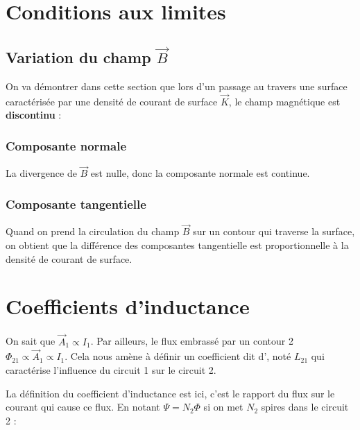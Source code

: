 \documentclass[12pt]{book}
\begin{document}
\section{Conditions aux limites}
\subsection{Variation du champ $\vec{B}$}
On va démontrer dans cette section que lors d'un passage au travers une surface caractérisée par une densité de courant de surface $\vec{K}$, le champ magnétique est \textbf{discontinu} :

\subsubsection{Composante normale}
La divergence de $\vec{B}$ est nulle, donc la composante normale est continue.
\subsubsection{Composante tangentielle}
Quand on prend la circulation du champ $\vec{B}$ sur un contour qui traverse la surface, on obtient que la différence des composantes tangentielle est proportionnelle à la densité de courant de surface.
\section{Coefficients d'inductance}
On sait que $\vec{A}_1 \propto I_1$. Par ailleurs, le flux embrassé par un contour 2 $\Phi_{21} \propto \vec{A}_1 \propto I_1$. Cela nous amène à définir un coefficient dit d', noté $L_{21}$ qui caractérise l'influence du circuit 1 sur le circuit 2.


La définition du coefficient d'inductance  est ici, c'est le rapport du flux sur le courant qui cause ce flux. En notant $\Psi = N_2 \Phi$ si on met $N_2$ spires dans le circuit 2 :

\end{document}
